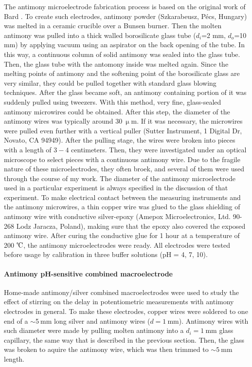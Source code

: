 The antimony microelectrode fabrication process is based on the original work of Bard \cite{horrocks1993scanning}.
To create such electrodes, antimony powder (Szka\-ra\-be\-usz, Pécs, Hungary) was melted in a ceramic crucible over a Bunsen burner. Then the molten antimony was pulled into a thick walled borosilicate glass tube ($d_i$=2 mm, $d_o$=10 mm) by applying vacuum using an aspirator on the back opening of the tube.
In this way, a continuous column of solid antimony was sealed into the glass tube.
Then, the glass tube with the antomony inside was melted again.
Since the melting points of antimony and the softening point of the borosilicate glass are very similar, they could be pulled together with standard glass blowing techniques.
After the glass became soft, an antimony containing portion of it was suddenly pulled using tweezers.
With this method, very fine, glass-sealed antimony microwires could be obtained.
After this step, the diameter of the antimony wires was typically around $30~\upmu$m.
If it was necessary, the microwires were pulled even further with a vertical puller (Sutter Instrument, 1 Digital Dr, Novato, CA 94949).
After the pulling stage, the wires were broken into pieces with a length of $3-4$ centimeters.
Then, they were investigated under an optical microscope to select pieces with a continuous antimony wire.
Due to the fragile nature of these microelectrodes, they often broek, and several of them were used through the course of my work.
The diameter of the antimony microelectrode used in a particular experiment is always specified in the discussion of that experiment.
To make electrical contact between the measuring instruments and the antimony microwires, a thin copper wire was glued to the glass shielding of antimony wire with conductive silver-epoxy (Amepox Microelectronics, Ltd.
90-268 Lodz Jaracza, Poland), making sure that the epoxy also covered the exposed antimony wire.
After curing the conductive glue for 1 hour at a temperature of 200 $\celsius$, the antimony microelectrodes were ready.
All electrodes were tested before usage by calibration in three buffer solutions (pH = 4, 7, 10). 

\paragraph{Antimony pH-sensitive combined macroelectrode}

Home-made antimony/silver combined macroelectrodes were used to study the effect of stirring on the delay in potentiometric measurements with antimony electrodes in general.
To make these electrodes, copper wires were soldered to one end of a $\sim$5$~$mm long silver and antimony wires ($d = 1~$mm).
Antimony wires with such diameter were made by pulling molten antimony into a $d_i = 1~$mm glass capillary, the same way that is described in the previous section.
Then, the glass was broken to aquire the antimony wire, which was then trimmed to $\sim 5~$mm length.

